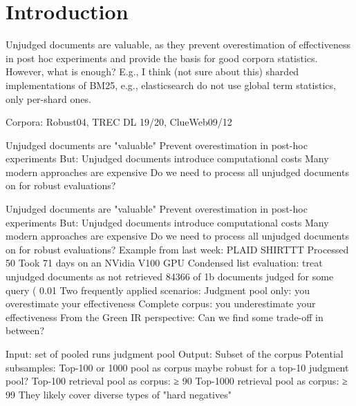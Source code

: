 \section{Introduction}

Unjudged documents are valuable, as they prevent overestimation of effectiveness in post hoc experiments and provide the basis for good corpora statistics. However, what is enough? E.g., I think (not sure about this) sharded implementations of BM25, e.g., elasticsearch do not use global term statistics, only per-shard ones.

Corpora: Robust04, TREC DL 19/20, ClueWeb09/12



Unjudged documents are "valuable"
Prevent overestimation in post-hoc experiments
But: Unjudged documents introduce computational costs
Many modern approaches are expensive
Do we need to process all unjudged documents on for robust evaluations?




Unjudged documents are "valuable"
Prevent overestimation in post-hoc experiments
But: Unjudged documents introduce computational costs
Many modern approaches are expensive
Do we need to process all unjudged documents on for robust evaluations?
Example from last week: PLAID SHIRTTT
Processed 50%
Took 71 days on an NVidia V100 GPU
Condensed list evaluation: treat unjudged documents as not retrieved
84366 of 1b documents judged for some query ( 0.01%
Two frequently applied scenarios:
Judgment pool only: you overestimate your effectiveness
Complete corpus: you underestimate your effectiveness
From the Green IR perspective: Can we find some trade-off in between?


Input:
set of pooled runs
judgment pool
Output:
Subset of the corpus
Potential subsamples:
Top-100 or 1000 pool as corpus maybe robust for a top-10 judgment pool?
Top-100 retrieval pool as corpus: ≥ 90%
Top-1000 retrieval pool as corpus: ≥ 99%
They likely cover diverse types of "hard negatives"
